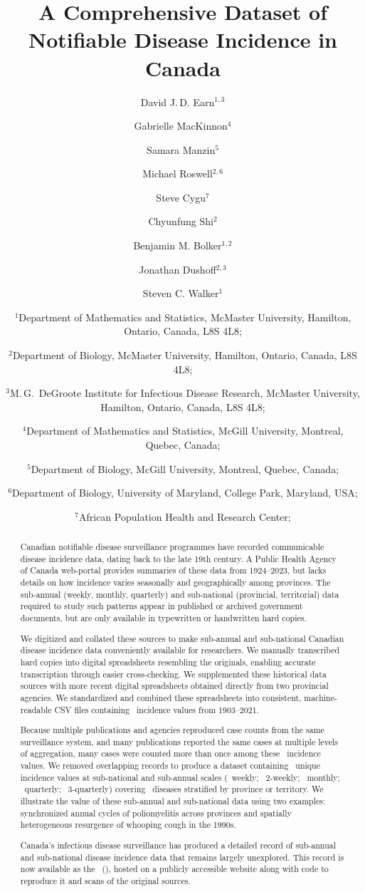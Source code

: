 \documentclass[12pt]{article}
\title{A Comprehensive Dataset of Notifiable Disease Incidence in Canada}
\author{
     David J.\,D. Earn$^{1,3}$
\and Gabrielle MacKinnon$^4$
\and Samara Manzin$^5$
\and Michael Roswell$^{2,6}$ %
\and Steve Cygu$^7$ %
\and Chyunfung Shi$^2$ %
\and Benjamin M. Bolker$^{1,2}$ %
\and Jonathan Dushoff$^{2,3}$ %
\and Steven C. Walker$^1$
\and \footnotesize$^1$Department of Mathematics and Statistics,
     McMaster University, Hamilton, Ontario, Canada, L8S 4L8;
\and \footnotesize$^2$Department of Biology,
     McMaster University, Hamilton, Ontario, Canada, L8S 4L8;
\and \footnotesize$^3$M.\,G.\ DeGroote Institute for Infectious Disease Research,
  McMaster University, Hamilton, Ontario, Canada, L8S 4L8;
\and \footnotesize$^4$Department of Mathematics and Statistics,
  McGill University, Montreal, Quebec, Canada;
\and \footnotesize$^5$Department of Biology,
  McGill University, Montreal, Quebec, Canada;
\and \footnotesize$^6$Department of Biology,
  University of Maryland, College Park, Maryland, USA;
\and \footnotesize$^7$African Population Health and Research Center;
  \\
}
\begin{document}
\maketitle


\newpage

\begin{abstract}

Canadian notifiable disease surveillance programmes have recorded communicable disease incidence data, dating back to the late 19th century. A Public Health Agency of Canada web-portal provides summaries of these data from 1924--2023, but lacks details on how incidence varies seasonally and geographically among provinces. The sub-annual (weekly, monthly, quarterly) and sub-national (provincial, territorial) data required to study such patterns appear in published or archived government documents, but are only available in typewritten or handwritten hard copies.

We digitized and collated these sources to make sub-annual and sub-national Canadian disease incidence data conveniently available for researchers. We manually transcribed hard copies into digital spreadsheets resembling the originals, enabling accurate transcription through easier cross-checking. We supplemented these historical data sources with more recent digital spreadsheets obtained directly from two provincial agencies. We standardized and combined these spreadsheets into consistent, machine-readable CSV files containing \ incidence values from 1903--2021.

Because multiple publications and agencies reproduced case counts from the same surveillance system, and many publications reported the same cases at multiple levels of aggregation, many cases were counted more than once among these \ incidence values. We removed overlapping records to produce a dataset containing \ unique incidence values at sub-national and sub-annual scales (\ weekly; \ 2-weekly; \ monthly; \ quarterly; \ 3-quarterly) covering \ diseases stratified by province or territory. We illustrate the value of these sub-annual and sub-national data using two examples: synchronized annual cycles of poliomyelitis across provinces and spatially heterogeneous resurgence of whooping cough in the 1990s.

Canada's infectious disease surveillance has produced a detailed record of sub-annual and sub-national disease incidence data that remains largely unexplored. This record is now available as the \datname\ (\datacronym), hosted on a publicly accessible website along with code to reproduce it and scans of the original sources.

\end{abstract}
\end{document}
